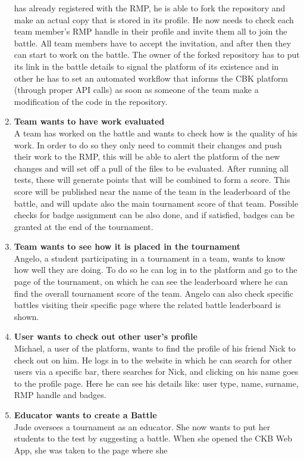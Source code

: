 \begin{enumerate}[label= \textbf{SC\arabic*}]
    has already registered with the RMP, he is able to fork the repository and make an actual copy that is stored in its profile. He now needs to check each team member's RMP handle in their profile and invite them all to join the 
    battle. All team members have to accept the invitation, and after then they can start to work on the battle. The owner of the forked repository has to put its link in the battle details to signal the platform of its existence and in
    other he has to set an automated workflow that informs the CBK platform (through proper API calls) as soon as someone of the team make a modification of the code in the repository.
    \item \textbf{Team wants to have work evaluated} \label{sc:sc8} \\ A team has worked on the battle and wants to check how is the quality of his work. In order to do so they only need to commit their changes and push their work to the RMP, 
    this will be able to alert the platform of the new changes and will set off a pull of the files to be evaluated. After running all tests, these will generate points that will be combined to form a score. This score will be 
    published near the name of the team in the leaderboard of the battle, and will update also the main tournament score of that team. Possible checks for badge assignment can be also done, and if satisfied, badges can be granted at 
    the end of the tournament.
    \item \textbf{Team wants to see how it is placed in the tournament} \label{sc:sc9} \\ Angelo, a student participating in a tournament in a team, wants to know how well they are doing. To do so he can log in to the platform and go to the page 
    of the tournament, on which he can see the leaderboard where he can find the overall tournament score of the team. Angelo can also check specific battles visiting their specific page where the related battle leaderboard is shown.
    \item \textbf{User wants to check out other user's profile} \label{sc:sc10} \\ Michael, a user of the platform, wants to find the profile of his friend Nick to check out on him. He logs in to the website in which he can search for other users 
    via a specific bar, there searches for Nick, and clicking on his name goes to the profile page. Here he can see his details like: user type, name, surname, RMP handle and badges.
    \item \textbf{Educator wants to create a Battle} \label{sc:sc11} \\Jude oversees a tournament as an educator. She now wants to put her students to the test by suggesting a battle. When she opened the CKB Web App, she was taken to the page where she 

\end{enumerate}
